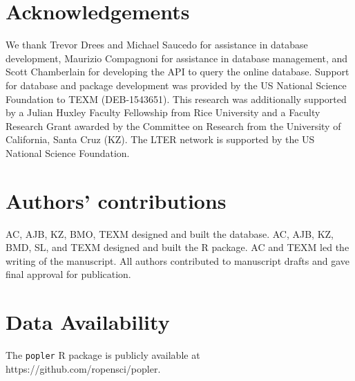 \documentclass{article}\usepackage[]{graphicx}\usepackage[]{color}
\begin{document}
\section*{Acknowledgements}
We thank Trevor Drees and Michael Saucedo for assistance in database development, Maurizio Compagnoni for assistance in database management, and Scott Chamberlain for developing the API to query the online database. Support for database and package development was provided by the US National Science Foundation to TEXM (DEB-1543651). This research was additionally supported by a Julian Huxley Faculty Fellowship from Rice University and a Faculty Research Grant awarded by the Committee on Research from the University of California, Santa Cruz (KZ). The LTER network is supported by the US National Science Foundation.

\section*{Authors' contributions}
AC, AJB, KZ, BMO, TEXM designed and built the database. AC, AJB, KZ, BMD, SL, and TEXM designed and built the R package. AC and TEXM led the writing of the manuscript. All authors contributed to manuscript drafts and gave final approval for publication.

\section*{Data Availability}
The \texttt{popler} R package is publicly available at https://github.com/ropensci/popler.

\newpage

\end{document}
